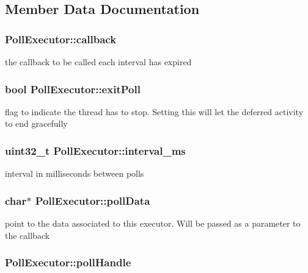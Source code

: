 \subsection{Member Data Documentation}
\hypertarget{structPollExecutor_a28319240732a17a19f78db7ff325c552}{
\subsubsection[{callback}]{ Poll\-Executor\-::callback}}\label{structPollExecutor_a28319240732a17a19f78db7ff325c552}
the callback to be called each interval has expired \hypertarget{structPollExecutor_a22f382f7d74c9cae694dc7b003bb12fb}{
\subsubsection[{exit\-Poll}]{\setlength{\rightskip}{0pt plus 5cm}bool Poll\-Executor\-::exit\-Poll}}\label{structPollExecutor_a22f382f7d74c9cae694dc7b003bb12fb}
flag to indicate the thread has to stop. Setting this will let the deferred activity to end gracefully \hypertarget{structPollExecutor_aa371cc9916044879d56ddff0a169bc0c}{
\subsubsection[{interval\-\_\-ms}]{\setlength{\rightskip}{0pt plus 5cm}uint32\-\_\-t Poll\-Executor\-::interval\-\_\-ms}}\label{structPollExecutor_aa371cc9916044879d56ddff0a169bc0c}
interval in milliseconds between polls \hypertarget{structPollExecutor_a6a278f48537a9f9701ff687ccc2125e8}{
\subsubsection[{poll\-Data}]{\setlength{\rightskip}{0pt plus 5cm}char$\ast$ Poll\-Executor\-::poll\-Data}}\label{structPollExecutor_a6a278f48537a9f9701ff687ccc2125e8}
point to the data associated to this executor. Will be passed as a parameter to the callback \hypertarget{structPollExecutor_ac4006982a46140b6b353c621921d171b}{
\subsubsection[{poll\-Handle}]{ Poll\-Executor\-::poll\-Handle}}\label{structPollExecutor_ac4006982a46140b6b353c621921d171b}
